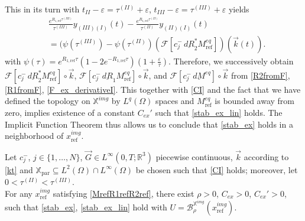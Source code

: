 \documentclass{ws-m3as}
\newcommand{\uld}[1]{\underline{d#1}}
\newcommand\Xpar{\mathbb{X}_{\text{par}}}
\newcommand\taup{\varepsilon}
\newcommand\tauone{\tau^{(II)}}
\newcommand\tautwo{\tau^{(III)}}
\newcommand\tII{t_{II}}
\newcommand\tIII{t_{III}}
\begin{document}
This in its turn with $\tII-\taup=\tauone+\taup$, $\tIII-\taup=\tautwo+\taup$ yields
\begin{equation}\label{R2fromF}
\begin{aligned}
&\frac{e^{R_{1,\text{ref}}\tautwo}}{\tautwo} y_{(III)(I)}(t)
-\frac{e^{R_{1,\text{ref}}\tauone}}{\tauone} y_{(II)(I)}(t)\\
&=
(\psi(\tautwo)-\psi(\tauone)
\left(\mathcal{F}\left[c^-_j \,\uld{R}_2^*M^{eq}_{\text{ref}} \right]\right) ({\vec k}(t)).
\end{aligned}
\end{equation}
with $\psi(\tau)=e^{R_{1,\text{ref}}\tau}(1-2e^{-R_{1,\text{ref}}\tau})(1+\tfrac{\taup}{\tau})$.
Therefore, we successively obtain 
$\mathcal{F}\left[c^-_j \,\uld{R}_2^*M^{eq}_{\text{ref}} \right]\circ{\vec k}$, 
$\mathcal{F}\left[c^-_j \,\uld{R}_1M^{eq}_{\text{ref}} \right]\circ{\vec k}$, 
and $\mathcal{F}\left[c^-_j \,\uld{M}^{eq} \right]\circ{\vec k}$ from \eqref{R2fromF}, \eqref{R1fromF}, \eqref{F_ex_derivativeI}. 
This together with \eqref{CI} and the fact that we have defined the topology on $\mathbb{X}^{img}$ by $L^q(\Omega)$ spaces and $M^{eq}_{\text{ref}}$ is bounded away from zero, implies existence of a constant $C_{ex}'$ such that \eqref{stab_ex_lin} holds.
The Implicit Function Theorem thus allows us to conclude that \eqref{stab_ex} holds in a neighborhood of $x^{img}_{\text{ref}}$.
\begin{proposition}
Let $c_j^-$, $j\in\{1,\ldots,N\}$, ${\vec G}\in L^\infty(0,T;\mathbb{R}^3)$ piecewise continuous, $\vec k$ according to \eqref{kt} and $\Xpar\subseteq L^2(\Omega)\cap L^\infty(\Omega)$ be chosen such that \eqref{CI} holds; moreover, let $0<\tauone<\tautwo$.
\\
For any $x^{img}_{\text{ref}}$ satisfying \eqref{MrefR1refR2ref}, 
there exist $\rho>0$, $C_{ex}>0$, $C_{ex}'>0$, such that \eqref{stab_ex}, \eqref{stab_ex_lin} hold with $U=\mathcal{B}_\rho^{\mathbb{X}^{img}}(x^{img}_{\text{ref}})$.
\end{proposition}
\end{document}
